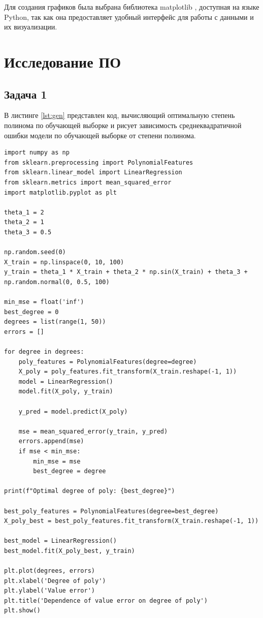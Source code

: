 \documentclass[12pt]{report}
\begin{document}
Для создания графиков была выбрана библиотека matplotlib \cite{bib:matplotlib}, доступная на языке Python, так как она предоставляет удобный интерфейс для работы с данными и их визуализации.

\section{Исследование ПО}

\subsection{Задача 1}
В листинге \ref{lst:gen} представлен код, вычисляющий оптимальную степень полинома по обучающей выборке и рисует зависимость среднеквадратичной ошибки модели по обучающей выборке от степени полинома.

\begin{lstlisting}[label=lst:gen,caption=код, решающий поставленную задачу]
import numpy as np
from sklearn.preprocessing import PolynomialFeatures
from sklearn.linear_model import LinearRegression
from sklearn.metrics import mean_squared_error
import matplotlib.pyplot as plt

theta_1 = 2
theta_2 = 1
theta_3 = 0.5

np.random.seed(0)
X_train = np.linspace(0, 10, 100)  
y_train = theta_1 * X_train + theta_2 * np.sin(X_train) + theta_3 + np.random.normal(0, 0.5, 100)  

min_mse = float('inf')
best_degree = 0
degrees = list(range(1, 50))
errors = []

for degree in degrees:
    poly_features = PolynomialFeatures(degree=degree)
    X_poly = poly_features.fit_transform(X_train.reshape(-1, 1))
    model = LinearRegression()
    model.fit(X_poly, y_train)

    y_pred = model.predict(X_poly)

    mse = mean_squared_error(y_train, y_pred)
    errors.append(mse)
    if mse < min_mse:
        min_mse = mse
        best_degree = degree

print(f"Optimal degree of poly: {best_degree}")

best_poly_features = PolynomialFeatures(degree=best_degree)
X_poly_best = best_poly_features.fit_transform(X_train.reshape(-1, 1))

best_model = LinearRegression()
best_model.fit(X_poly_best, y_train)

plt.plot(degrees, errors)
plt.xlabel('Degree of poly')
plt.ylabel('Value error')
plt.title('Dependence of value error on degree of poly')
plt.show()

\end{lstlisting}
\end{document}
